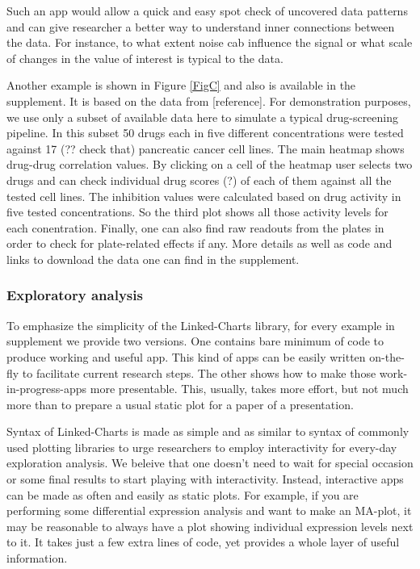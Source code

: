 \documentclass[twocolumn,10pt]{article}
\begin{document}
Such an app would allow a quick and easy spot check of uncovered data patterns and can give researcher a better way to understand inner connections between the data. For instance, to what extent noise cab influence the signal or what scale of changes in the value of interest is typical to the data.

Another example is shown in Figure \ref{FigC} and also is available in the supplement. It is based on the data from [reference].
For demonstration purposes, we use only a subset of available data here to simulate a typical drug-screening pipeline. In this subset 50 drugs each in five different concentrations were tested against 17 (?? check that) pancreatic cancer cell lines. The main heatmap shows drug-drug correlation values. By clicking on a cell of the heatmap user selects two drugs and can check individual drug scores (?) of each of them against all the tested cell lines. The inhibition values were calculated based on drug activity in five tested concentrations. So the third plot shows all those activity levels for each conentration. Finally, one can also find raw readouts from the plates in order to check for plate-related effects if any. More details as well as code and links to download the data one can find in the supplement.

\subsubsection{Exploratory analysis}
To emphasize the simplicity of the Linked-Charts library, for every example in supplement we provide two versions. One contains bare minimum of code to produce working and useful app. This kind of apps can be easily written on-the-fly to facilitate current research steps. The other shows how to make those work-in-progress-apps more presentable. This, usually, takes more effort, but not much more than to prepare a usual static plot for a paper of a presentation.

Syntax of Linked-Charts is made as simple and as similar to syntax of commonly used plotting libraries to urge researchers to employ interactivity for every-day exploration analysis. We beleive that one doesn't need to wait for special occasion or some final results to start playing with interactivity. Instead, interactive apps can be made as often and easily as static plots. For example, if you are performing some differential expression analysis and want to make an MA-plot, it may be reasonable to always have a plot showing individual expression levels next to it. It takes just a few extra lines of code, yet provides a whole layer of useful information.
\end{document}
